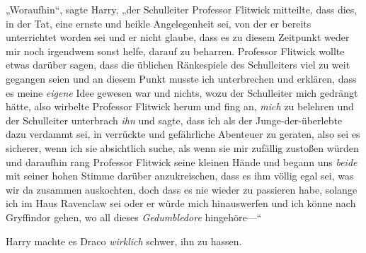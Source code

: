 „Woraufhin“, sagte Harry, „der Schulleiter Professor Flitwick mitteilte, dass dies, in der Tat, eine ernste und heikle Angelegenheit sei, von der er bereits unterrichtet worden sei und er nicht glaube, dass es zu diesem Zeitpunkt weder mir noch irgendwem sonst helfe, darauf zu beharren. Professor Flitwick wollte etwas darüber sagen, dass die üblichen Ränkespiele des Schulleiters viel zu weit gegangen seien und an diesem Punkt musste ich unterbrechen und erklären, dass es meine \emph{eigene} Idee gewesen war und nichts, wozu der Schulleiter mich gedrängt hätte, also wirbelte Professor Flitwick herum und fing an, \emph{mich} zu belehren und der Schulleiter unterbrach \emph{ihn} und sagte, dass ich als der Junge-der-überlebte dazu verdammt sei, in verrückte und gefährliche Abenteuer zu geraten, also sei es sicherer, wenn ich sie absichtlich suche, als wenn sie mir zufällig zustoßen würden und daraufhin rang Professor Flitwick seine kleinen Hände und begann uns \emph{beide} mit seiner hohen Stimme darüber anzukreischen, dass es ihm völlig egal sei, was wir da zusammen auskochten, doch dass es nie wieder zu passieren habe, solange ich im Haus Ravenclaw sei oder er würde mich hinauswerfen und ich könne nach Gryffindor gehen, wo all dieses \emph{Gedumbledore} hingehöre—“

Harry machte es Draco \emph{wirklich} schwer, ihn zu hassen.


